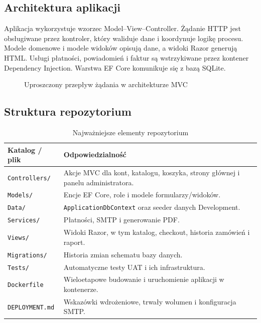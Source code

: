 \documentclass[12pt,a4paper]{article}
\begin{document}
\subsection{Architektura aplikacji}
Aplikacja wykorzystuje wzorzec Model--View--Controller. Żądanie HTTP jest
obsługiwane przez kontroler, który waliduje dane i koordynuje logikę procesu.
Modele domenowe i modele widoków opisują dane, a widoki Razor generują HTML.
Usługi płatności, powiadomień i faktur są wstrzykiwane przez kontener
Dependency Injection. Warstwa EF Core komunikuje się z bazą SQLite.

\begin{figure}[H]
\centering
\small
{}
\caption{Uproszczony przepływ żądania w architekturze MVC}
\label{fig:architecture}
\end{figure}

\subsection{Struktura repozytorium}
\begin{table}[H]
\centering
\small
\begin{tabularx}{\textwidth}{@{}l X@{}}
\toprule
\textbf{Katalog / plik} & \textbf{Odpowiedzialność}\\
\midrule
\texttt{Controllers/} & Akcje MVC dla kont, katalogu, koszyka, strony głównej i panelu administratora.\\
\texttt{Models/} & Encje EF Core, role i modele formularzy/widoków.\\
\texttt{Data/} & \texttt{ApplicationDbContext} oraz seeder danych Development.\\
\texttt{Services/} & Płatności, SMTP i generowanie PDF.\\
\texttt{Views/} & Widoki Razor, w tym katalog, checkout, historia zamówień i raport.\\
\texttt{Migrations/} & Historia zmian schematu bazy danych.\\
\texttt{Tests/} & Automatyczne testy UAT i ich infrastruktura.\\
\texttt{Dockerfile} & Wieloetapowe budowanie i uruchomienie aplikacji w kontenerze.\\
\texttt{DEPLOYMENT.md} & Wskazówki wdrożeniowe, trwały wolumen i konfiguracja SMTP.\\
\bottomrule
\end{tabularx}
\caption{Najważniejsze elementy repozytorium}
\end{table}
\end{document}
